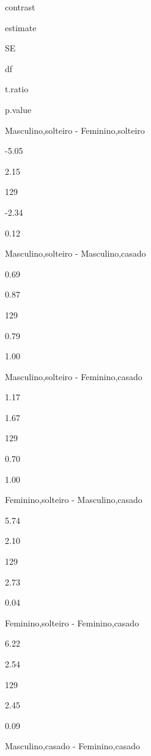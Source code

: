 \documentclass[
]{book}
\newenvironment{Shaded}{\begin{snugshade}}{\end{snugshade}}
\newcommand{\DataTypeTok}[1]{\textcolor[rgb]{0.13,0.29,0.53}{#1}}
\newcommand{\DecValTok}[1]{\textcolor[rgb]{0.00,0.00,0.81}{#1}}
\newcommand{\KeywordTok}[1]{\textcolor[rgb]{0.13,0.29,0.53}{\textbf{#1}}}
\newcommand{\NormalTok}[1]{#1}
\newcommand{\OperatorTok}[1]{\textcolor[rgb]{0.81,0.36,0.00}{\textbf{#1}}}
\newcommand{\StringTok}[1]{\textcolor[rgb]{0.31,0.60,0.02}{#1}}
\begin{document}
\begin{Shaded}
\end{Shaded}

contrast

estimate

SE

df

t.ratio

p.value

Masculino,solteiro - Feminino,solteiro

-5.05

2.15

129

-2.34

0.12

Masculino,solteiro - Masculino,casado

0.69

0.87

129

0.79

1.00

Masculino,solteiro - Feminino,casado

1.17

1.67

129

0.70

1.00

Feminino,solteiro - Masculino,casado

5.74

2.10

129

2.73

0.04

Feminino,solteiro - Feminino,casado

6.22

2.54

129

2.45

0.09

Masculino,casado - Feminino,casado
\end{document}
